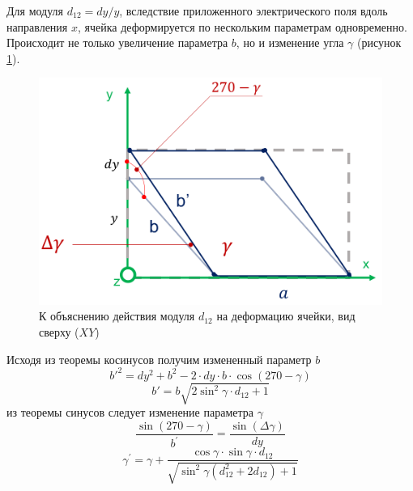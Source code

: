 Для модуля $d_{12} = dy/y$, вследствие приложенного электрического поля вдоль направления $x$,
ячейка деформируется по нескольким параметрам одновременно. Происходит не только увеличение
параметра $b$, но и изменение угла $\gamma$ (рисунок \ref{ris:d12}).

\begin{figure}[H]
  \centering
  \includegraphics[width=.6\textwidth]{images/d12.png}
  \caption{К объяснению действия модуля $d_{12}$ на деформацию ячейки, вид сверху ($XY$)}
  \label{ris:d12}
\end{figure}

Исходя из теоремы косинусов получим измененный параметр $b$
\begin{equation}
   b'^2=dy^2+b^2-2 \cdot dy \cdot b \cdot \cos(270-\gamma) \nonumber
   \label{eq:b_formed_1}
\end{equation}
\begin{equation}
   b' = b \sqrt{ 2\sin^2 \gamma \cdot d_{12}+1}
   \label{eq:b_formed_2}
\end{equation}
из теоремы синусов следует изменение параметра $\gamma$
\begin{equation}
   \frac{\sin(270-\gamma)}{b^{'}} = \frac{\sin (\Delta \gamma)}{dy} \nonumber
   \label{eq:b_formed_3}
\end{equation}
\begin{equation}
   \gamma^{'} = \gamma + \frac{\cos\gamma \cdot \sin \gamma \cdot d_{12}}{ \sqrt{ \sin^2 \gamma  (d_{12}^2 + 2d_{12})+1}}
   \label{eq:b_formed_4}
\end{equation}


